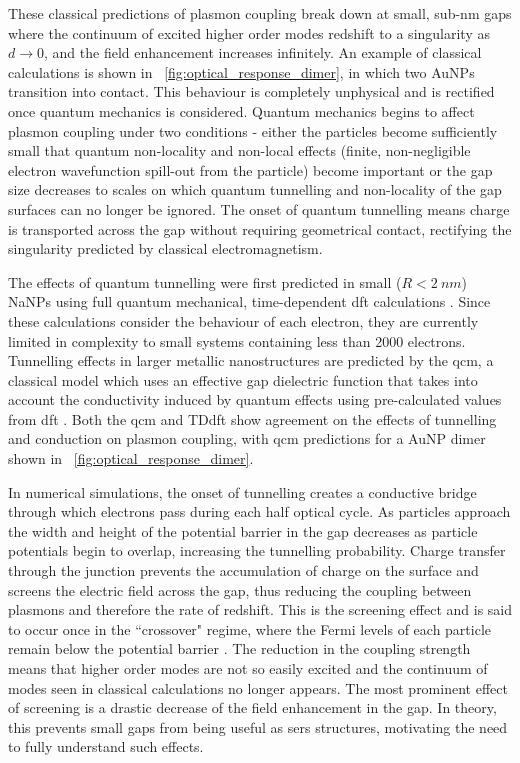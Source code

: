 \documentclass{article}
\begin{document}
These classical predictions of plasmon coupling break down at small, sub-nm gaps where the continuum of excited higher order modes redshift to a singularity as $d\rightarrow0$, and the field enhancement increases infinitely. An example of classical calculations is shown in \figurename~\ref{fig:optical_response_dimer}, in which two AuNPs transition into contact. This behaviour is completely unphysical and is rectified once quantum mechanics is considered.
Quantum mechanics begins to affect plasmon coupling under two conditions - either the particles become sufficiently small that quantum non-locality and non-local effects (finite, non-negligible electron wavefunction spill-out from the particle) become important or the gap size decreases to scales on which quantum tunnelling and non-locality of the gap surfaces can no longer be ignored. The onset of quantum tunnelling means charge is transported across the gap without requiring geometrical contact, rectifying the singularity predicted by classical electromagnetism.

The effects of quantum tunnelling were first predicted in small ($R<\SI{2}{nm}$) NaNPs using full quantum mechanical, time-dependent \gls{dft} calculations \cite{zuloaga2009}. Since these calculations consider the behaviour of each electron, they are currently limited in complexity to small systems containing less than 2000 electrons. Tunnelling effects in larger metallic nanostructures are predicted by the \gls{qcm}, a classical model which uses an effective gap dielectric function that takes into account the conductivity induced by quantum effects using pre-calculated values from \gls{dft} \cite{esteban2012}. Both the \gls{qcm} and TD\gls{dft} show agreement on the effects of tunnelling and conduction on plasmon coupling, with \gls{qcm} predictions for a AuNP dimer shown in \figurename~\ref{fig:optical_response_dimer}.

In numerical simulations, the onset of tunnelling creates a conductive bridge through which electrons pass during each half optical cycle. As particles approach the width and height of the potential barrier in the gap decreases as particle potentials begin to overlap, increasing the tunnelling probability. Charge transfer through the junction prevents the accumulation of charge on the surface and screens the electric field across the gap, thus reducing the coupling between plasmons and therefore the rate of redshift. This is the screening effect and is said to occur once in the ``crossover" regime, where the Fermi levels of each particle remain below the potential barrier \cite{zuloaga2009}. The reduction in the coupling strength means that higher order modes are not so easily excited and the continuum of modes seen in classical calculations no longer appears. The most prominent effect of screening is a drastic decrease of the field enhancement in the gap. In theory, this prevents small gaps from being useful as \gls{sers} structures, motivating the need to fully understand such effects. 
\end{document}
